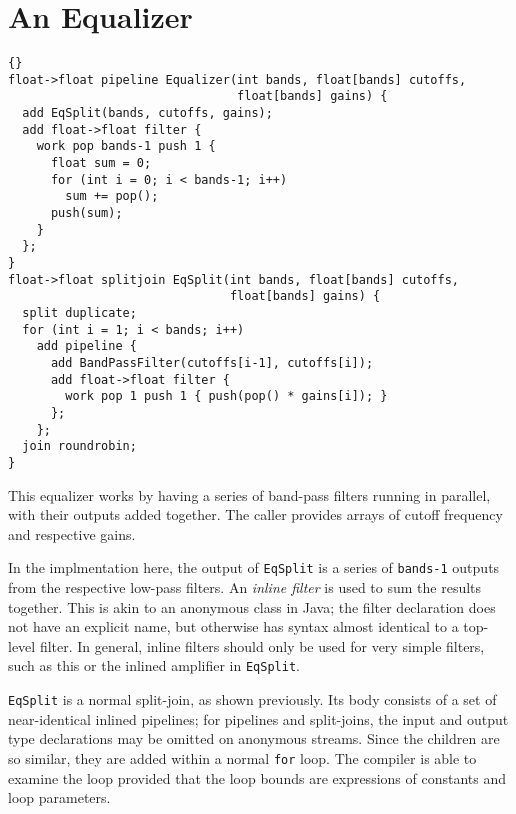\section{An Equalizer}

\begin{lstlisting}{}
float->float pipeline Equalizer(int bands, float[bands] cutoffs,
                                float[bands] gains) {
  add EqSplit(bands, cutoffs, gains);
  add float->float filter {
    work pop bands-1 push 1 {
      float sum = 0;
      for (int i = 0; i < bands-1; i++)
        sum += pop();
      push(sum);
    }
  };
}
float->float splitjoin EqSplit(int bands, float[bands] cutoffs,
                               float[bands] gains) {
  split duplicate;
  for (int i = 1; i < bands; i++)
    add pipeline {
      add BandPassFilter(cutoffs[i-1], cutoffs[i]);
      add float->float filter {
        work pop 1 push 1 { push(pop() * gains[i]); }
      };
    };
  join roundrobin;
}
\end{lstlisting}

This equalizer works by having a series of band-pass filters running
in parallel, with their outputs added together.  The caller provides
arrays of cutoff frequency and respective gains.

In the implmentation here, the output of \lstinline|EqSplit| is a
series of \lstinline|bands-1| outputs from the respective low-pass
filters.  An \emph{inline filter} is used to sum the results
together.  This is akin to an anonymous class in Java; the filter
declaration does not have an explicit name, but otherwise has syntax
almost identical to a top-level filter.  In general, inline filters
should only be used for very simple filters, such as this or the
inlined amplifier in \lstinline|EqSplit|.

\lstinline|EqSplit| is a normal split-join, as shown previously.  Its
body consists of a set of near-identical inlined pipelines; for
pipelines and split-joins, the input and output type declarations may
be omitted on anonymous streams.  Since the children are so similar,
they are added within a normal \lstinline|for| loop.  The compiler is
able to examine the loop provided that the loop bounds are expressions
of constants and loop parameters.
